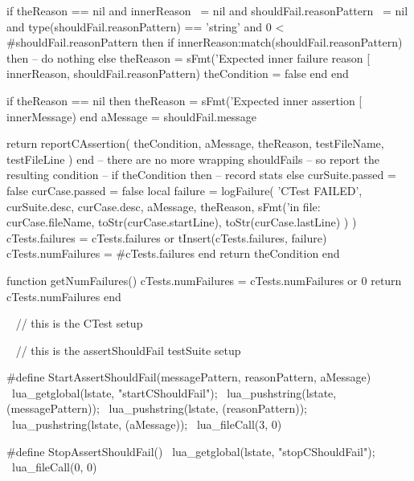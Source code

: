     if theReason == nil
      and innerReason ~= nil
      and shouldFail.reasonPattern ~= nil
      and type(shouldFail.reasonPattern) == 'string'
      and 0 < #shouldFail.reasonPattern then
      if innerReason:match(shouldFail.reasonPattern) then
        -- do nothing
      else
        theReason = sFmt('Expected inner failure reason [%
          innerReason, shouldFail.reasonPattern)
        theCondition = false
      end
    end
    
    if theReason == nil then
      theReason = sFmt('Expected inner assertion [%
        innerMessage)
    end
    aMessage = shouldFail.message
    
    return reportCAssertion(
      theCondition,
      aMessage,
      theReason,
      testFileName,
      testFileLine
    )
  end
  -- there are no more wrapping shouldFails
  -- so report the resulting condition
  --
  if theCondition then
    -- record stats
  else
    curSuite.passed = false
    curCase.passed  = false
    local failure = logFailure(
      'CTest FAILED',
      curSuite.desc,
      curCase.desc,
      aMessage,
      theReason,
      sFmt('in file: %
        curCase.fileName,
        toStr(curCase.startLine),
        toStr(curCase.lastLine)
      )
    )
    cTests.failures = cTests.failures or { }
    tInsert(cTests.failures, failure)
    cTests.numFailures = #cTests.failures
  end
  return theCondition
end

function getNumFailures()
  cTests.numFailures = cTests.numFailures or 0
  return cTests.numFailures
end
\stopLuaCode

\CTestsSetup\
\startCTest
  // this is the CTest setup
\stopCTest


\CTestsSuiteSetup\
\startCTest
  // this is the assertShouldFail testSuite setup
\stopCTest

\startCHeader
#define StartAssertShouldFail(messagePattern, reasonPattern, aMessage) \
  lua_getglobal(lstate, "startCShouldFail");                           \
  lua_pushstring(lstate, (messagePattern));                            \
  lua_pushstring(lstate, (reasonPattern));                             \
  lua_pushstring(lstate, (aMessage));                                  \
  lua_fileCall(3, 0)

#define StopAssertShouldFail()              \
  lua_getglobal(lstate, "stopCShouldFail"); \
  lua_fileCall(0, 0)
\stopCHeader

